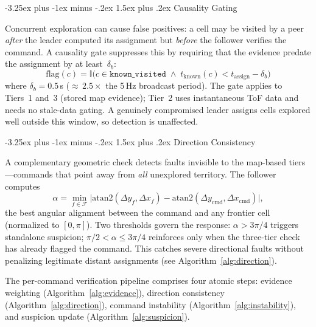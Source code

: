 \documentclass[conference]{IEEEtran}
\makeatletter
\renewcommand{\subsection}{\@startsection{subsection}{2}{\z@}%
  {-3.25ex plus -1ex minus -.2ex}%
  {1.5ex plus .2ex}%
  {\normalfont\normalsize\itshape\centering}}
\makeatother
\begin{document}
\subsection{Causality Gating}
\label{sec:causality}

Concurrent exploration can cause false positives: a cell may be visited by a peer \emph{after} the leader computed its assignment but \emph{before} the follower verifies the command. A causality gate suppresses this by requiring that the evidence predate the assignment by at least~$\delta_b$:
\begin{equation}
    \text{flag}(c) = \mathbb{I}\bigl(c \in \texttt{known\_visited}
    \;\wedge\; t_{\text{known}}(c) < t_{\text{assign}} - \delta_b\bigr)
\end{equation}
where $\delta_b = 0.5\,$s (${\approx}\,2.5\times$ the 5\,Hz broadcast period). The gate applies to Tiers~1 and~3 (stored map evidence); Tier~2 uses instantaneous ToF data and needs no stale-data gating. A genuinely compromised leader assigns cells explored well outside this window, so detection is unaffected.

\subsection{Direction Consistency}
\label{sec:direction_consistency}

A complementary geometric check detects faults invisible to the map-based tiers---commands that point away from \emph{all} unexplored territory. The follower computes
\begin{equation}
    \alpha = \min_{f \in \mathcal{F}} \bigl|\text{atan2}(\Delta y_f,
    \Delta x_f) - \text{atan2}(\Delta y_{\text{cmd}},
    \Delta x_{\text{cmd}})\bigr|,
\end{equation}
the best angular alignment between the command and any frontier cell (normalized to $[0,\pi]$). Two thresholds govern the response: $\alpha > 3\pi/4$ triggers standalone suspicion; $\pi/2 < \alpha \leq 3\pi/4$ reinforces only when the three-tier check has already flagged the command. This catches severe directional faults without penalizing legitimate distant assignments (see Algorithm~\ref{alg:direction}).

The per-command verification pipeline comprises four atomic steps: evidence weighting (Algorithm~\ref{alg:evidence}), direction consistency (Algorithm~\ref{alg:direction}), command instability (Algorithm~\ref{alg:instability}), and suspicion update (Algorithm~\ref{alg:suspicion}).
\end{document}
